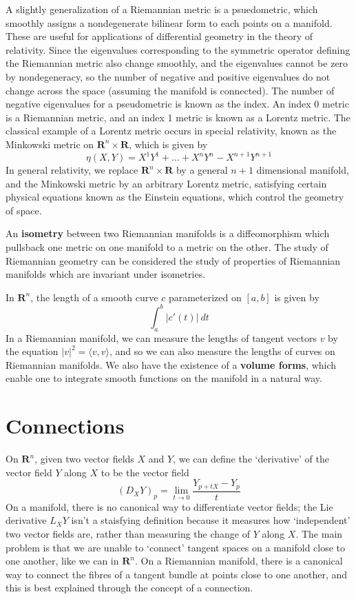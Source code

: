 A slightly generalization of a Riemannian metric is a psuedometric, which smoothly assigns a nondegenerate bilinear form to each points on a manifold. These are useful for applications of differential geometry in the theory of relativity. Since the eigenvalues corresponding to the symmetric operator defining the Riemannian metric also change smoothly, and the eigenvalues cannot be zero by nondegeneracy, so the number of negative and positive eigenvalues do not change across the space (assuming the manifold is connected). The number of negative eigenvalues for a pseudometric is known as the index. An index 0 metric is a Riemannian metric, and an index 1 metric is known as a Lorentz metric. The classical example of a Lorentz metric occurs in special relativity, known as the Minkowski metric on $\mathbf{R}^n \times \mathbf{R}$, which is given by
%
\[ \eta(X,Y) = X^1Y^1 + \dots + X^nY^n - X^{n+1}Y^{n+1} \]
%
In general relativity, we replace $\mathbf{R}^n \times \mathbf{R}$ by a general $n+1$ dimensional manifold, and the Minkowski metric by an arbitrary Lorentz metric, satisfying certain physical equations known as the Einstein equations, which control the geometry of space.

An {\bf isometry} between two Riemannian manifolds is a diffeomorphism which pullsback one metric on one manifold to a metric on the other. The study of Riemannian geometry can be considered the study of properties of Riemannian manifolds which are invariant under isometries.

In $\mathbf{R}^n$, the length of a smooth curve $c$ parameterized on $[a,b]$ is given by
%
\[ \int_a^b |c'(t)|\ dt \]
%
In a Riemannian manifold, we can measure the lengths of tangent vectors $v$ by the equation $|v|^2 = \langle v, v \rangle$, and so we can also measure the lengths of curves on Riemannian manifolds. We also have the existence of a {\bf volume forms}, which enable one to integrate smooth functions on the manifold in a natural way.

\section{Connections}

On $\mathbf{R}^n$, given two vector fields $X$ and $Y$, we can define the `derivative' of the vector field $Y$ along $X$ to be the vector field
%
\[ (D_X Y)_p = \lim_{t \to 0} \frac{Y_{p + tX} - Y_p}{t} \]
%
On a manifold, there is no canonical way to differentiate vector fields; the Lie derivative $L_XY$ isn't a staisfying definition because it measures how `independent' two vector fields are, rather than measuring the change of $Y$ along $X$. The main problem is that we are unable to `connect' tangent spaces on a manifold close to one another, like we can in $\mathbf{R}^n$. On a Riemannian manifold, there is a canonical way to connect the fibres of a tangent bundle at points close to one another, and this is best explained through the concept of a connection.


